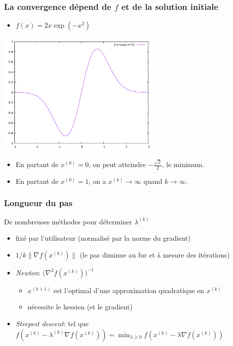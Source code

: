 \documentclass{beamer}
\begin{document}
\begin{frame}
  \frametitle{La convergence dépend de $f$ et de la solution initiale}

  \begin{itemize}
    \item $f(x) = 2x\exp{(-x^2)}$
  \end{itemize}
  
  \begin{center}
      \includegraphics[width=0.6\textwidth]{desc-grad-non-conv}    
  \end{center}
  
  \begin{itemize}
  \item En partant de $x^{(0)} = 0$, on peut atteindre $-\frac{\sqrt{2}}{2}$, le minimum.
  \item En partant de $x^{(0)} = 1$, on a $x^{(k)} \rightarrow \infty$ quand $k \rightarrow \infty$. 
  \end{itemize}
  
\end{frame}


\begin{frame}
  \frametitle{Longueur du pas}

  \begin{block}{De nombreuses méthodes pour déterminer $\lambda^{(k)}$}
  \begin{itemize}
  \item fixé par l'utilisateur (normalisé par la norme du gradient)
  \item $1 / k \|{\nabla f}(x^{(k)})\|$ (le pas diminue au fur et à mesure des itérations)
  \item \emph{Newton}: $\Big( {\nabla^2 f}(x^{(k)}) \Big)^{-1}$
    \begin{itemize}
    \item $x^{(k+1)}$ est l'optimal d'une approximation quadratique en $x^{(k)}$
    \item nécessite le hessien (et le gradient)
    \end{itemize}
  \item \emph{Steepest descent}: tel que $f(x^{(k)} - \lambda^{(k)} {\nabla f}(x^{(k)}))
    = \min_{\lambda \geq 0} f(x^{(k)} - \lambda {\nabla f}(x^{(k)}))$
  \end{itemize}
  \end{block}
\end{frame}
\end{document}
